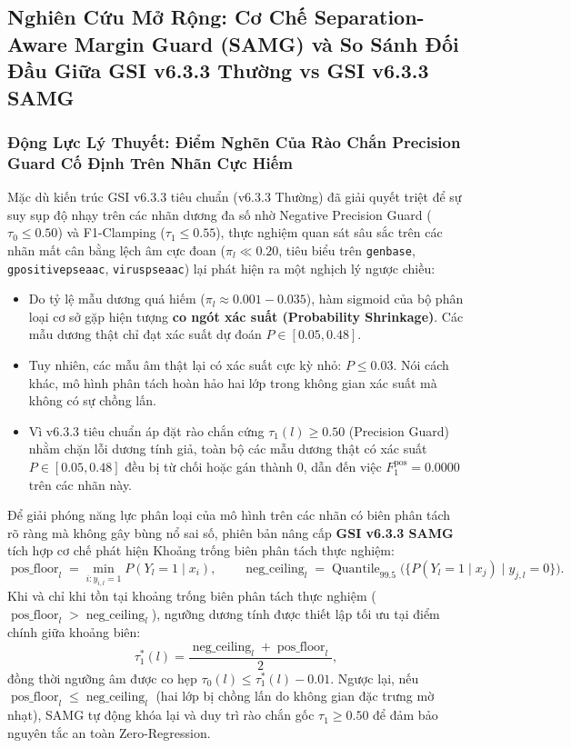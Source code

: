 \documentclass[10pt,a4paper,twoside]{article}
\begin{document}
\subsection{Nghiên Cứu Mở Rộng: Cơ Chế Separation-Aware Margin Guard (SAMG) và So Sánh Đối Đầu Giữa GSI v6.3.3 Thường vs GSI v6.3.3 SAMG}

\subsubsection{Động Lực Lý Thuyết: Điểm Nghẽn Của Rào Chắn Precision Guard Cố Định Trên Nhãn Cực Hiếm}
Mặc dù kiến trúc GSI v6.3.3 tiêu chuẩn (v6.3.3 Thường) đã giải quyết triệt để sự suy sụp độ nhạy trên các nhãn dương đa số nhờ Negative Precision Guard ($\tau_0 \le 0.50$) và F1-Clamping ($\tau_1 \le 0.55$), thực nghiệm quan sát sâu sắc trên các nhãn mất cân bằng lệch âm cực đoan ($\pi_l \ll 0.20$, tiêu biểu trên \texttt{genbase}, \texttt{gpositivepseaac}, \texttt{viruspseaac}) lại phát hiện ra một nghịch lý ngược chiều:
\begin{itemize}[leftmargin=*]
    \item Do tỷ lệ mẫu dương quá hiếm ($\pi_l \approx 0.001 - 0.035$), hàm sigmoid của bộ phân loại cơ sở gặp hiện tượng \textbf{co ngót xác suất (Probability Shrinkage)}. Các mẫu dương thật chỉ đạt xác suất dự đoán $P \in [0.05, 0.48]$.
    \item Tuy nhiên, các mẫu âm thật lại có xác suất cực kỳ nhỏ: $P \le 0.03$. Nói cách khác, mô hình phân tách hoàn hảo hai lớp trong không gian xác suất mà không có sự chồng lấn.
    \item Vì v6.3.3 tiêu chuẩn áp đặt rào chắn cứng $\tau_1(l) \ge 0.50$ (Precision Guard) nhằm chặn lỗi dương tính giả, toàn bộ các mẫu dương thật có xác suất $P \in [0.05, 0.48]$ đều bị từ chối hoặc gán thành 0, dẫn đến việc $F_1^{\text{pos}} = 0.0000$ trên các nhãn này.
\end{itemize}

Để giải phóng năng lực phân loại của mô hình trên các nhãn có biên phân tách rõ ràng mà không gây bùng nổ sai số, phiên bản nâng cấp \textbf{GSI v6.3.3 SAMG} tích hợp cơ chế phát hiện Khoảng trống biên phân tách thực nghiệm:
\begin{equation}
\operatorname{pos\_floor}_l = \min_{i: y_{i, l} = 1} P(Y_l = 1 \mid x_i), \qquad \operatorname{neg\_ceiling}_l = \operatorname{Quantile}_{99.5}\Big(\{P(Y_l = 1 \mid x_j) \mid y_{j, l} = 0\}\Big).
\end{equation}
Khi và chỉ khi tồn tại khoảng trống biên phân tách thực nghiệm ($\operatorname{pos\_floor}_l > \operatorname{neg\_ceiling}_l$), ngưỡng dương tính được thiết lập tối ưu tại điểm chính giữa khoảng biên:
\begin{equation}
\tau_1^*(l) = \frac{\operatorname{neg\_ceiling}_l + \operatorname{pos\_floor}_l}{2},
\end{equation}
đồng thời ngưỡng âm được co hẹp $\tau_0(l) \le \tau_1^*(l) - 0.01$. Ngược lại, nếu $\operatorname{pos\_floor}_l \le \operatorname{neg\_ceiling}_l$ (hai lớp bị chồng lấn do không gian đặc trưng mờ nhạt), SAMG tự động khóa lại và duy trì rào chắn gốc $\tau_1 \ge 0.50$ để đảm bảo nguyên tắc an toàn Zero-Regression.
\end{document}
